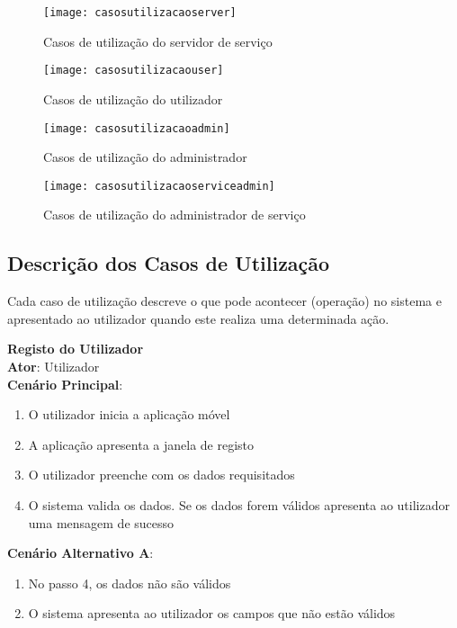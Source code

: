 \begin{figure}[ht]
	\centering
	\texttt{[image: casosutilizacaoserver]}
	\caption{Casos de utilização do servidor de serviço}
  	\label{fig:casosutilizacaoserver}
\end{figure}

\begin{figure}[hp]
	\centering
	\texttt{[image: casosutilizacaouser]}
	\caption{Casos de utilização do utilizador}
  	\label{fig:casosutilizacaouser}
\end{figure}

\begin{figure}[hp]
	\centering
	\texttt{[image: casosutilizacaoadmin]}
	\caption{Casos de utilização do administrador}
  	\label{fig:casosutilizacaoadmin}
\end{figure}

\begin{figure}[hp]
	\centering
	\texttt{[image: casosutilizacaoserviceadmin]}
	\caption{Casos de utilização do administrador de serviço}
  	\label{fig:casosutilizacaoserviceadmin}
\end{figure}

\newpage

\subsection{Descrição dos Casos de Utilização}

Cada caso de utilização descreve o que pode acontecer (operação) no sistema e apresentado ao utilizador quando este realiza uma determinada ação.

{\large \textbf{Registo do Utilizador}} \\
\textbf{Ator}: Utilizador \\
\textbf{Cenário Principal}:

\begin{enumerate}[nolistsep]
	\item O utilizador inicia a aplicação móvel
	\item A aplicação apresenta a janela de registo
	\item O utilizador preenche com os dados requisitados
	\item O sistema valida os dados. Se os dados forem válidos apresenta ao utilizador uma mensagem de sucesso
\end{enumerate}

\textbf{Cenário Alternativo A}:
\begin{enumerate}[nolistsep]
	\item No passo 4, os dados não são válidos
	\item O sistema apresenta ao utilizador os campos que não estão válidos
\end{enumerate}

